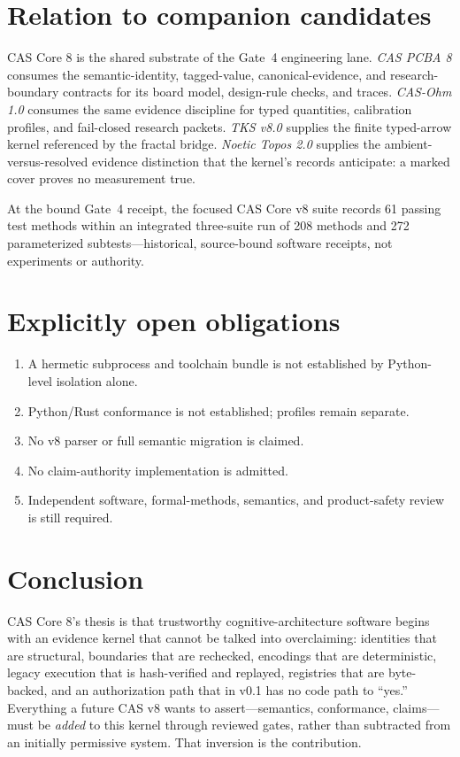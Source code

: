 \documentclass[11pt]{amsart}
\theoremstyle{definition}
\theoremstyle{remark}
\begin{document}
\section{Relation to companion candidates}

CAS Core 8 is the shared substrate of the Gate~4 engineering lane. \emph{CAS PCBA 8} consumes the semantic-identity, tagged-value, canonical-evidence, and research-boundary contracts for its board model, design-rule checks, and traces. \emph{CAS-Ohm 1.0} consumes the same evidence discipline for typed quantities, calibration profiles, and fail-closed research packets. \emph{TKS v8.0} supplies the finite typed-arrow kernel referenced by the fractal bridge. \emph{Noetic Topos 2.0} supplies the ambient-versus-resolved evidence distinction that the kernel's records anticipate: a marked cover proves no measurement true.

At the bound Gate~4 receipt, the focused CAS Core v8 suite records 61 passing test methods within an integrated three-suite run of 208 methods and 272 parameterized subtests---historical, source-bound software receipts, not experiments or authority.

\section{Explicitly open obligations}

\begin{enumerate}
\item A hermetic subprocess and toolchain bundle is not established by Python-level isolation alone.
\item Python/Rust conformance is not established; profiles remain separate.
\item No v8 parser or full semantic migration is claimed.
\item No claim-authority implementation is admitted.
\item Independent software, formal-methods, semantics, and product-safety review is still required.
\end{enumerate}

\section{Conclusion}

CAS Core 8's thesis is that trustworthy cognitive-architecture software begins with an evidence kernel that cannot be talked into overclaiming: identities that are structural, boundaries that are rechecked, encodings that are deterministic, legacy execution that is hash-verified and replayed, registries that are byte-backed, and an authorization path that in v0.1 has no code path to ``yes.'' Everything a future CAS v8 wants to assert---semantics, conformance, claims---must be \emph{added} to this kernel through reviewed gates, rather than subtracted from an initially permissive system. That inversion is the contribution.
\end{document}
